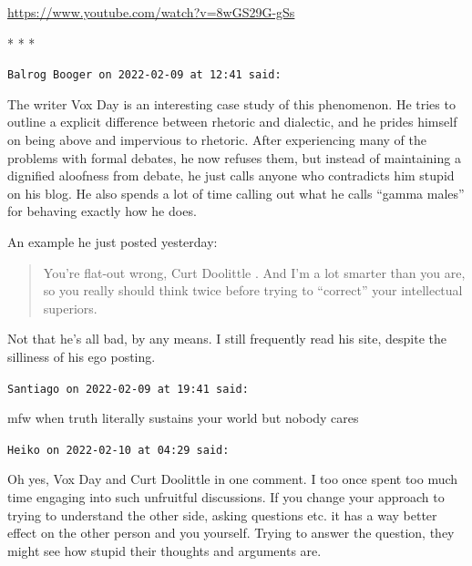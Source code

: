 \url{https://www.youtube.com/watch?v=8wGS29G-gSs} 


\begin{center}* * *\end{center}

\begin{footnotesize}
\begin{sffamily}
\texttt{Balrog Booger on 2022-02-09 at 12:41 said:}

The writer Vox Day is an interesting case study of this phenomenon. He tries to outline a explicit difference between rhetoric and dialectic, and he prides himself on being above and impervious to rhetoric. After experiencing many of the problems with formal debates, he now refuses them, but instead of maintaining a dignified aloofness from debate, he just calls anyone who contradicts him stupid on his blog. He also spends a lot of time calling out what he calls ``gamma males'' for behaving exactly how he does.

An example he just posted yesterday:

\begin{quote}

You're flat-out wrong, Curt Doolittle . And I'm a lot smarter than you are, so you really should think twice before trying to ``correct'' your intellectual superiors.
\end{quote}


Not that he's all bad, by any means. I still frequently read his site, despite the silliness of his ego posting.

\hfill

\texttt{Santiago on 2022-02-09 at 19:41 said:}

mfw when truth literally sustains your world but nobody cares

\hfill

\texttt{Heiko on 2022-02-10 at 04:29 said:}

Oh yes, Vox Day and Curt Doolittle in one comment. I too once spent too much time engaging into such unfruitful discussions. If you change your approach to trying to understand the other side, asking questions etc. it has a way better effect on the other person and you yourself. Trying to answer the question, they might see how stupid their thoughts and arguments are.

\end{sffamily}
\end{footnotesize}

